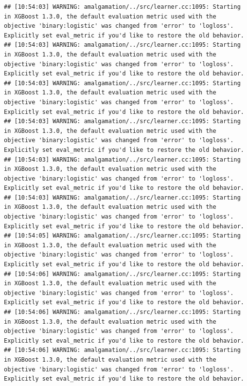 \documentclass[
]{scrbook}
\begin{document}
\begin{verbatim}
## [10:54:03] WARNING: amalgamation/../src/learner.cc:1095: Starting in XGBoost 1.3.0, the default evaluation metric used with the objective 'binary:logistic' was changed from 'error' to 'logloss'. Explicitly set eval_metric if you'd like to restore the old behavior.
## [10:54:03] WARNING: amalgamation/../src/learner.cc:1095: Starting in XGBoost 1.3.0, the default evaluation metric used with the objective 'binary:logistic' was changed from 'error' to 'logloss'. Explicitly set eval_metric if you'd like to restore the old behavior.
## [10:54:03] WARNING: amalgamation/../src/learner.cc:1095: Starting in XGBoost 1.3.0, the default evaluation metric used with the objective 'binary:logistic' was changed from 'error' to 'logloss'. Explicitly set eval_metric if you'd like to restore the old behavior.
## [10:54:03] WARNING: amalgamation/../src/learner.cc:1095: Starting in XGBoost 1.3.0, the default evaluation metric used with the objective 'binary:logistic' was changed from 'error' to 'logloss'. Explicitly set eval_metric if you'd like to restore the old behavior.
## [10:54:03] WARNING: amalgamation/../src/learner.cc:1095: Starting in XGBoost 1.3.0, the default evaluation metric used with the objective 'binary:logistic' was changed from 'error' to 'logloss'. Explicitly set eval_metric if you'd like to restore the old behavior.
## [10:54:03] WARNING: amalgamation/../src/learner.cc:1095: Starting in XGBoost 1.3.0, the default evaluation metric used with the objective 'binary:logistic' was changed from 'error' to 'logloss'. Explicitly set eval_metric if you'd like to restore the old behavior.
## [10:54:05] WARNING: amalgamation/../src/learner.cc:1095: Starting in XGBoost 1.3.0, the default evaluation metric used with the objective 'binary:logistic' was changed from 'error' to 'logloss'. Explicitly set eval_metric if you'd like to restore the old behavior.
## [10:54:06] WARNING: amalgamation/../src/learner.cc:1095: Starting in XGBoost 1.3.0, the default evaluation metric used with the objective 'binary:logistic' was changed from 'error' to 'logloss'. Explicitly set eval_metric if you'd like to restore the old behavior.
## [10:54:06] WARNING: amalgamation/../src/learner.cc:1095: Starting in XGBoost 1.3.0, the default evaluation metric used with the objective 'binary:logistic' was changed from 'error' to 'logloss'. Explicitly set eval_metric if you'd like to restore the old behavior.
## [10:54:06] WARNING: amalgamation/../src/learner.cc:1095: Starting in XGBoost 1.3.0, the default evaluation metric used with the objective 'binary:logistic' was changed from 'error' to 'logloss'. Explicitly set eval_metric if you'd like to restore the old behavior.

\end{verbatim}
\end{document}
